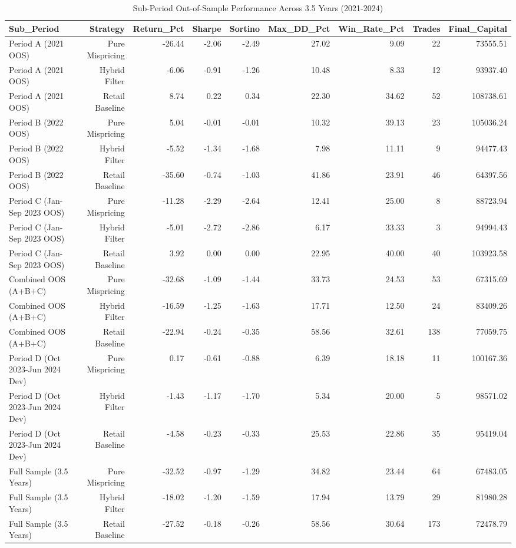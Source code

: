 \begin{table}
\caption{Sub-Period Out-of-Sample Performance Across 3.5 Years (2021-2024)}
\label{tab:results}
\begin{tabular}{lrrrrrrrr}
\toprule
Sub_Period & Strategy & Return_Pct & Sharpe & Sortino & Max_DD_Pct & Win_Rate_Pct & Trades & Final_Capital \\
\midrule
Period A (2021 OOS) & Pure Mispricing & -26.44 & -2.06 & -2.49 & 27.02 & 9.09 & 22 & 73555.51 \\
Period A (2021 OOS) & Hybrid Filter & -6.06 & -0.91 & -1.26 & 10.48 & 8.33 & 12 & 93937.40 \\
Period A (2021 OOS) & Retail Baseline & 8.74 & 0.22 & 0.34 & 22.30 & 34.62 & 52 & 108738.61 \\
Period B (2022 OOS) & Pure Mispricing & 5.04 & -0.01 & -0.01 & 10.32 & 39.13 & 23 & 105036.24 \\
Period B (2022 OOS) & Hybrid Filter & -5.52 & -1.34 & -1.68 & 7.98 & 11.11 & 9 & 94477.43 \\
Period B (2022 OOS) & Retail Baseline & -35.60 & -0.74 & -1.03 & 41.86 & 23.91 & 46 & 64397.56 \\
Period C (Jan-Sep 2023 OOS) & Pure Mispricing & -11.28 & -2.29 & -2.64 & 12.41 & 25.00 & 8 & 88723.94 \\
Period C (Jan-Sep 2023 OOS) & Hybrid Filter & -5.01 & -2.72 & -2.86 & 6.17 & 33.33 & 3 & 94994.43 \\
Period C (Jan-Sep 2023 OOS) & Retail Baseline & 3.92 & 0.00 & 0.00 & 22.95 & 40.00 & 40 & 103923.58 \\
Combined OOS (A+B+C) & Pure Mispricing & -32.68 & -1.09 & -1.44 & 33.73 & 24.53 & 53 & 67315.69 \\
Combined OOS (A+B+C) & Hybrid Filter & -16.59 & -1.25 & -1.63 & 17.71 & 12.50 & 24 & 83409.26 \\
Combined OOS (A+B+C) & Retail Baseline & -22.94 & -0.24 & -0.35 & 58.56 & 32.61 & 138 & 77059.75 \\
Period D (Oct 2023-Jun 2024 Dev) & Pure Mispricing & 0.17 & -0.61 & -0.88 & 6.39 & 18.18 & 11 & 100167.36 \\
Period D (Oct 2023-Jun 2024 Dev) & Hybrid Filter & -1.43 & -1.17 & -1.70 & 5.34 & 20.00 & 5 & 98571.02 \\
Period D (Oct 2023-Jun 2024 Dev) & Retail Baseline & -4.58 & -0.23 & -0.33 & 25.53 & 22.86 & 35 & 95419.04 \\
Full Sample (3.5 Years) & Pure Mispricing & -32.52 & -0.97 & -1.29 & 34.82 & 23.44 & 64 & 67483.05 \\
Full Sample (3.5 Years) & Hybrid Filter & -18.02 & -1.20 & -1.59 & 17.94 & 13.79 & 29 & 81980.28 \\
Full Sample (3.5 Years) & Retail Baseline & -27.52 & -0.18 & -0.26 & 58.56 & 30.64 & 173 & 72478.79 \\
\bottomrule
\end{tabular}
\end{table}
